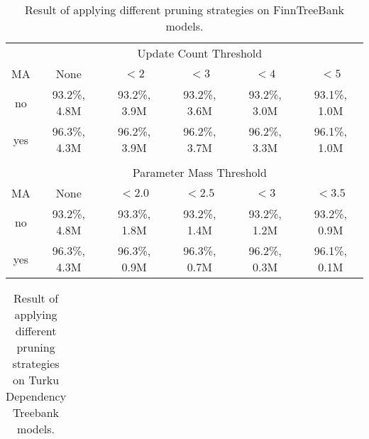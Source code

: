 \begin{table}[htb!]
\begin{center}
\begin{tabular}{c|ccccc}
\multicolumn{1}{c}{}        & \multicolumn{5}{c}{Update Count Threshold}\\
MA                     & None           & $< 2$        & $< 3$        & $< 4$        & $< 5$       \\
\hline
no                     & 93.2\%, 4.8M   & 93.2\%, 3.9M & 93.2\%, 3.6M & 93.2\%, 3.0M & 93.1\%, 1.0M \\
yes                    & 96.3\%, 4.3M   & 96.2\%, 3.9M & 96.2\%, 3.7M & 96.2\%, 3.3M & 96.1\%, 1.0M \\
                       &                &              &              &              &              \\
\multicolumn{1}{c}{}                        & \multicolumn{5}{c}{Parameter Mass Threshold}\\
MA                     & None         & $< 2.0$      & $< 2.5$      & $< 3$      & $< 3.5$        \\
\hline
no                     & 93.2\%, 4.8M & 93.3\%, 1.8M & 93.2\%, 1.4M & 93.2\%, 1.2M & 93.2\%, 0.9M \\
yes                    & 96.3\%, 4.3M & 96.3\%, 0.9M & 96.3\%, 0.7M & 96.2\%, 0.3M & 96.1\%, 0.1M \\
\end{tabular}
\caption{Result of applying different pruning strategies on FinnTreeBank models.}
\end{center}
\end{table}

\begin{table}[htb!]
\begin{center}
\begin{tabular}{c|ccccc}

\end{tabular}
\caption{Result of applying different pruning strategies on Turku Dependency Treebank models.}
\end{center}
\end{table}

